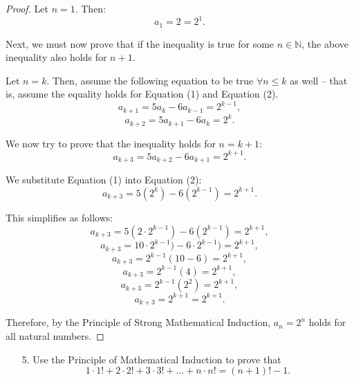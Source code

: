 \documentclass[10pt]{article}
\theoremstyle{definition}
\theoremstyle{plain}
\newcommand{\N}{\mathbb{N}}
\begin{document}
\setcounter{equation}{0}
\begin{proof}
  Let $n=1$. Then:
  $$a_1 = 2 = 2^1.$$

  \par Next, we must now prove that if the inequality is true for some $n\in\N$, the above inequality also holds for $n+1$.

  \par Let $n=k$. Then, assume the following equation to be true $\forall n \leq k$ as well -- that is, assume the equality holds for Equation (1) and Equation (2).
  \begin{equation}
    a_{k+1} = 5a_{k} - 6a_{k-1} = 2^{k-1},
  \end{equation}
  \begin{equation}
    a_{k+2} = 5a_{k+1} - 6a_{k} = 2^{k}.
  \end{equation}

  \par We now try to prove that the inequality holds for $n=k+1$:
  \begin{equation}
    a_{k+3} = 5a_{k+2} - 6a_{k+1} = 2^{k+1}.
  \end{equation}

  \par We substitute Equation (1) into Equation (2):
  \begin{equation}
    a_{k+3} = 5(2^k) - 6(2^{k-1}) = 2^{k+1}.
  \end{equation}

  \par This simplifies as follows:
    $$a_{k+3} = 5(2\cdot2^{k-1}) - 6(2^{k-1}) = 2^{k+1},$$
    $$a_{k+3} = 10\cdot2^{k-1}) - 6\cdot2^{k-1}) = 2^{k+1},$$
    $$a_{k+3} = 2^{k-1}(10 - 6) = 2^{k+1},$$
    $$a_{k+3} = 2^{k-1}(4) = 2^{k+1},$$
    $$a_{k+3} = 2^{k-1}(2^2) = 2^{k+1},$$
  \begin{equation}
    a_{k+3} = 2^{k+1} = 2^{k+1}.
  \end{equation}

  \par Therefore, by the Principle of Strong Mathematical Induction, $a_n = 2^n$ holds for all natural numbers.
\end{proof}



\pagebreak



\begin{enumerate}
  \item[5.] Use the Principle of Mathematical Induction to prove that
  $$1 \cdot 1! + 2 \cdot 2! + 3 \cdot 3! + \dots + n \cdot n! = (n+1)! - 1.$$
\end{enumerate}
\end{document}
